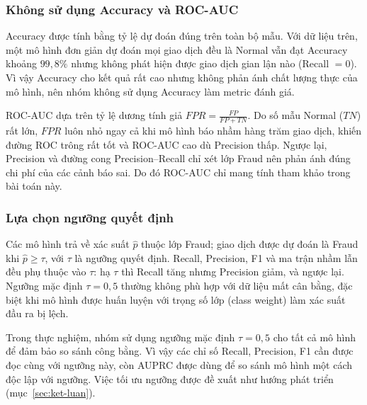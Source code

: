 \subsubsection{Không sử dụng Accuracy và ROC-AUC}
Accuracy được tính bằng tỷ lệ dự đoán đúng trên toàn bộ mẫu. Với dữ liệu trên, một mô hình đơn giản dự đoán mọi giao dịch đều là Normal vẫn đạt Accuracy khoảng $99{,}8\%$ nhưng không phát hiện được giao dịch gian lận nào (Recall $=0$). Vì vậy Accuracy cho kết quả rất cao nhưng không phản ánh chất lượng thực của mô hình, nên nhóm không sử dụng Accuracy làm metric đánh giá.

ROC-AUC dựa trên tỷ lệ dương tính giả $FPR = \frac{FP}{FP + TN}$. Do số mẫu Normal ($TN$) rất lớn, $FPR$ luôn nhỏ ngay cả khi mô hình báo nhầm hàng trăm giao dịch, khiến đường ROC trông rất tốt và ROC-AUC cao dù Precision thấp. Ngược lại, Precision và đường cong Precision--Recall chỉ xét lớp Fraud nên phản ánh đúng chi phí của các cảnh báo sai. Do đó ROC-AUC chỉ mang tính tham khảo trong bài toán này.

\subsubsection{Lựa chọn ngưỡng quyết định}
Các mô hình trả về xác suất $\hat{p}$ thuộc lớp Fraud; giao dịch được dự đoán là Fraud khi $\hat{p} \ge \tau$, với $\tau$ là ngưỡng quyết định. Recall, Precision, F1 và ma trận nhầm lẫn đều phụ thuộc vào $\tau$: hạ $\tau$ thì Recall tăng nhưng Precision giảm, và ngược lại. Ngưỡng mặc định $\tau = 0{,}5$ thường không phù hợp với dữ liệu mất cân bằng, đặc biệt khi mô hình được huấn luyện với trọng số lớp (class weight) làm xác suất đầu ra bị lệch.

Trong thực nghiệm, nhóm sử dụng ngưỡng mặc định $\tau = 0{,}5$ cho tất cả mô hình để đảm bảo so sánh công bằng. Vì vậy các chỉ số Recall, Precision, F1 cần được đọc cùng với ngưỡng này, còn AUPRC được dùng để so sánh mô hình một cách độc lập với ngưỡng. Việc tối ưu ngưỡng được đề xuất như hướng phát triển (mục~\ref{sec:ket-luan}).
